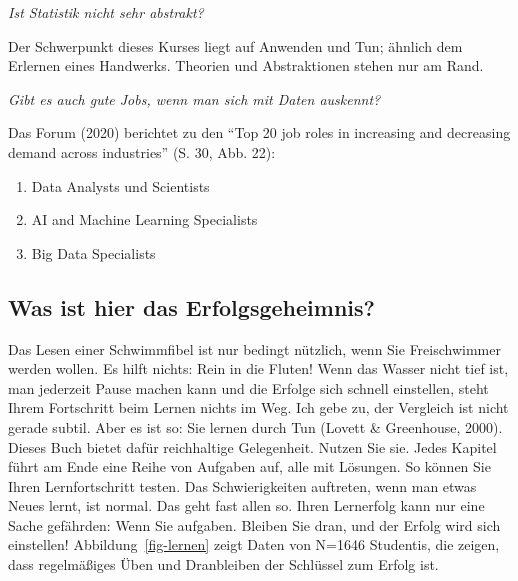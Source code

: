 \documentclass[
  a4paper,
]{scrbook}
\providecommand{\tightlist}{%
  \setlength{\itemsep}{0pt}\setlength{\parskip}{0pt}}\usepackage{longtable,booktabs,array}
\theoremstyle{definition}
\theoremstyle{definition}
\theoremstyle{definition}
\theoremstyle{remark}
\begin{document}
\emph{Ist Statistik nicht sehr abstrakt?}

Der Schwerpunkt dieses Kurses liegt auf Anwenden und Tun; ähnlich dem
Erlernen eines Handwerks. Theorien und Abstraktionen stehen nur am Rand.

\emph{Gibt es auch gute Jobs, wenn man sich mit Daten auskennt?}

Das Forum (2020) berichtet zu den ``Top 20 job roles in increasing and
decreasing demand across industries'' (S. 30, Abb. 22):

\begin{enumerate}
\def\labelenumi{\arabic{enumi}.}
\tightlist
\item
  Data Analysts und Scientists
\item
  AI and Machine Learning Specialists
\item
  Big Data Specialists
\end{enumerate}

\subsection{Was ist hier das
Erfolgsgeheimnis?}\label{was-ist-hier-das-erfolgsgeheimnis}

Das Lesen einer Schwimmfibel ist nur bedingt nützlich, wenn Sie
Freischwimmer werden wollen. Es hilft nichts: Rein in die Fluten! Wenn
das Wasser nicht tief ist, man jederzeit Pause machen kann und die
Erfolge sich schnell einstellen, steht Ihrem Fortschritt beim Lernen
nichts im Weg. Ich gebe zu, der Vergleich ist nicht gerade subtil. Aber
es ist so: Sie lernen durch Tun (Lovett \& Greenhouse, 2000). Dieses
Buch bietet dafür reichhaltige Gelegenheit. Nutzen Sie sie. Jedes
Kapitel führt am Ende eine Reihe von Aufgaben auf, alle mit Lösungen. So
können Sie Ihren Lernfortschritt testen. Das Schwierigkeiten auftreten,
wenn man etwas Neues lernt, ist normal. Das geht fast allen so. Ihren
Lernerfolg kann nur eine Sache gefährden: Wenn Sie aufgaben. Bleiben Sie
dran, und der Erfolg wird sich einstellen! Abbildung~\ref{fig-lernen}
zeigt Daten von N=1646 Studentis, die zeigen, dass regelmäßiges Üben und
Dranbleiben der Schlüssel zum Erfolg ist.
\end{document}
